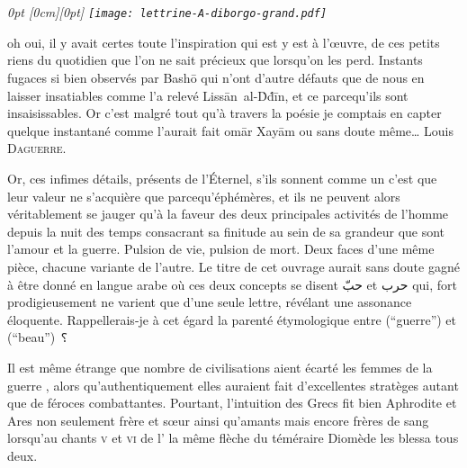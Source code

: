
\section*{}
\thispagestyle{empty}
{
  \em\small
  0pt \textwidth
  0pt                \textwidth
  \noindent{}\raisebox{-\height+0.565cm}[0cm][0pt]{
  \hspace{-1.7cm}\texttt{[image: lettrine-A-diborgo-grand.pdf]}}%
 oh oui, il y avait certes toute l’inspiration qui est y est à l’œuvre, de ces petits riens du quotidien que l’on ne sait précieux que lorsqu’on les perd. Instants fugaces si bien observés par Bashō qui n’ont d’autre défauts que de nous en laisser insatiables comme l’a relevé Lissān~al-Ḋḋīn, et ce parcequ’ils sont insaisissables. Or c’est malgré tout  qu’à travers la poésie je comptais en capter quelque instantané comme l’aurait fait omār Xayām ou sans doute même… Louis \textsc{Daguerre}.

  Or, ces infimes détails, présents de l’Éternel, s’ils sonnent comme un  c’est  que leur valeur ne s’acquière que parcequ’éphémères, et ils ne peuvent alors véritablement se jauger qu’à la faveur des deux principales activités de l’homme depuis la nuit des temps consacrant sa finitude au sein de sa grandeur que sont l’amour et la guerre. Pulsion de vie, pulsion de mort. Deux faces d’une même pièce, chacune variante de l’autre. Le titre de cet ouvrage aurait sans doute gagné à être donné en langue arabe où ces deux concepts se disent  \textarabic{حبّ} et  \textarabic{حرب} qui, fort prodigieusement ne varient que d’une seule lettre, révélant une assonance éloquente. Rappellerais-je à cet égard la parenté étymologique entre  (\enquote{guerre}) et  (\enquote{beau}) ⸮

   Il est même étrange que nombre de civilisations aient écarté les femmes de la guerre , alors qu’authentiquement elles auraient fait d’excellentes stratèges autant que de féroces combattantes. Pourtant, l’intuition des Grecs fit bien Aphrodite et Ares non seulement frère et sœur ainsi qu’amants mais encore frères de sang lorsqu’au chants \textsc{v} et \textsc{vi} de l’ la même flèche du téméraire Diomède les blessa tous deux.

}
